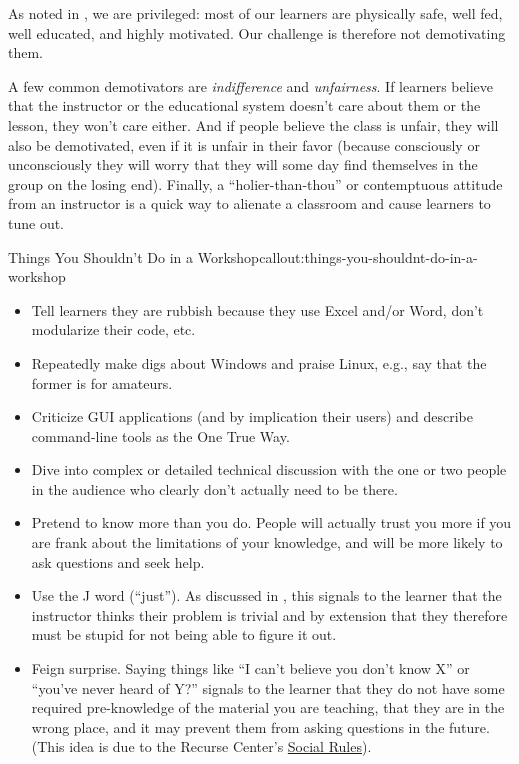 
As noted in , we are privileged: most of our learners are physically
safe, well fed, well educated, and highly motivated. Our challenge is
therefore not demotivating them.

A few common demotivators are \emph{indifference} and \emph{unfairness}.
If learners believe that the instructor or the educational system
doesn't care about them or the lesson, they won't care either. And if
people believe the class is unfair, they will also be demotivated, even
if it is unfair in their favor (because consciously or unconsciously
they will worry that they will some day find themselves in the group on
the losing end). Finally, a ``holier-than-thou'' or contemptuous
attitude from an instructor is a quick way to alienate a classroom and
cause learners to tune out.

\begin{callout}{Things You Shouldn't Do in a Workshop}{callout:things-you-shouldnt-do-in-a-workshop}

\begin{itemize}
\item
  Tell learners they are rubbish because they use Excel and/or Word,
  don't modularize their code, etc.
\item
  Repeatedly make digs about Windows and praise Linux, e.g., say that
  the former is for amateurs.
\item
  Criticize GUI applications (and by implication their users) and
  describe command-line tools as the One True Way.
\item
  Dive into complex or detailed technical discussion with the one or two
  people in the audience who clearly don't actually need to be there.
\item
  Pretend to know more than you do. People will actually trust you more
  if you are frank about the limitations of your knowledge, and will be
  more likely to ask questions and seek help.
\item
  Use the J word (``just''). As discussed in , this
  signals to the learner that the instructor thinks their problem is
  trivial and by extension that they therefore must be stupid for not
  being able to figure it out.
\item
  Feign surprise. Saying things like ``I can't believe you don't know
  X'' or ``you've never heard of Y?'' signals to the learner that they
  do not have some required pre-knowledge of the material you are
  teaching, that they are in the wrong place, and it may prevent them
  from asking questions in the future. (This idea is due to the Recurse
  Center's \href{https://www.recurse.com/manual\#sec-environment}{Social
  Rules}).
\end{itemize}
\end{callout}

